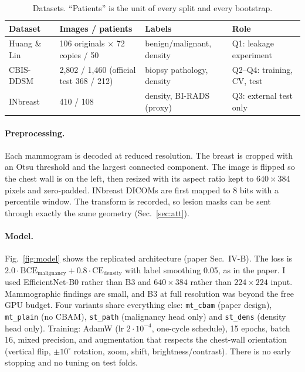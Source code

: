 \documentclass[10pt,a4paper]{article}
\begin{document}
\begin{table}[h]
\centering\small
\caption{Datasets. ``Patients'' is the unit of every split and every bootstrap.}\label{tab:data}
\begin{tabularx}{\linewidth}{@{}lllX@{}}
\toprule
Dataset & Images / patients & Labels & Role \\
\midrule
Huang \& Lin~\cite{huang2020} & 106 originals $\times$ 72 copies / 50 & benign/malignant, density & Q1: leakage experiment \\
CBIS-DDSM~\cite{lee2017} & 2,802 / 1,460 (official test 368 / 212) & biopsy pathology, density & Q2--Q4: training, CV, test \\
INbreast~\cite{moreira2012} & 410 / 108 & density, BI-RADS (proxy) & Q3: external test only \\
\bottomrule
\end{tabularx}
\end{table}

\paragraph{Preprocessing.} Each mammogram is decoded at reduced resolution. The breast is cropped with an Otsu
threshold and the largest connected component. The image is flipped so the chest wall is on the left, then resized
with its aspect ratio kept to $640\times384$ pixels and zero-padded. INbreast DICOMs are first mapped to 8 bits with a
percentile window. The transform is recorded, so lesion masks can be sent through exactly the same geometry
(Sec.~\ref{sec:att}).

\paragraph{Model.} Fig.~\ref{fig:model} shows the replicated architecture (paper Sec.~IV-B). The loss is
$2.0\cdot\mathrm{BCE}_{\text{malignancy}}+0.8\cdot\mathrm{CE}_{\text{density}}$ with label smoothing 0.05, as in the paper.
I used EfficientNet-B0 rather than B3 and $640\times384$ rather than $224\times224$ input. Mammographic findings are
small, and B3 at full resolution was beyond the free GPU budget. Four variants share everything else:
\texttt{mt\_cbam} (paper design), \texttt{mt\_plain} (no CBAM), \texttt{st\_path} (malignancy head only) and
\texttt{st\_dens} (density head only). Training: AdamW (lr $2\cdot10^{-4}$, one-cycle schedule), 15 epochs, batch 16,
mixed precision, and augmentation that respects the chest-wall orientation (vertical flip, $\pm10^\circ$ rotation, zoom,
shift, brightness/contrast). There is no early stopping and no tuning on test folds.
\end{document}
